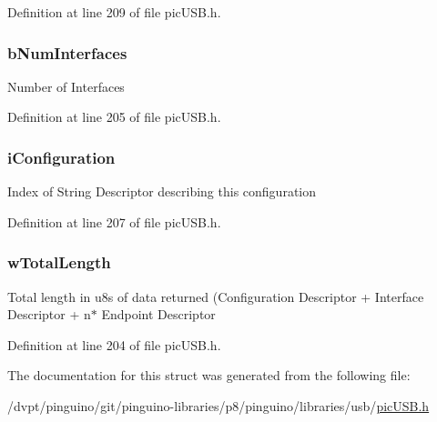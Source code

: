 Definition at line 209 of file pic\-U\-S\-B.\-h.

\hypertarget{struct_u_s_b___configuration___descriptor___header_a95e07e6c1b3f47969801be56a187e9f2}{
\subsubsection[{b\-Num\-Interfaces}]{ b\-Num\-Interfaces}}\label{struct_u_s_b___configuration___descriptor___header_a95e07e6c1b3f47969801be56a187e9f2}
Number of Interfaces 

Definition at line 205 of file pic\-U\-S\-B.\-h.

\hypertarget{struct_u_s_b___configuration___descriptor___header_a836aa4bfb503b80ec1fefbc48b13494a}{
\subsubsection[{i\-Configuration}]{ i\-Configuration}}\label{struct_u_s_b___configuration___descriptor___header_a836aa4bfb503b80ec1fefbc48b13494a}
Index of String Descriptor describing this configuration 

Definition at line 207 of file pic\-U\-S\-B.\-h.

\hypertarget{struct_u_s_b___configuration___descriptor___header_a839de5e515458f253878f84601db72ee}{
\subsubsection[{w\-Total\-Length}]{ w\-Total\-Length}}\label{struct_u_s_b___configuration___descriptor___header_a839de5e515458f253878f84601db72ee}
Total length in u8s of data returned (Configuration Descriptor + Interface Descriptor + n$\ast$ Endpoint Descriptor 

Definition at line 204 of file pic\-U\-S\-B.\-h.



The documentation for this struct was generated from the following file\-:\begin{DoxyCompactItemize}
\item 
/dvpt/pinguino/git/pinguino-\/libraries/p8/pinguino/libraries/usb/\hyperlink{pic_u_s_b_8h}{pic\-U\-S\-B.\-h}\end{DoxyCompactItemize}
